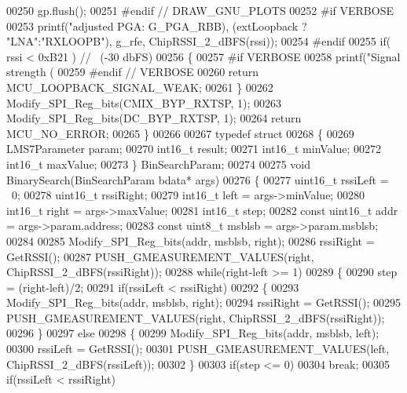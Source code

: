 \begin{DoxyCode}
{{{{{00250     gp.flush();
00251 \textcolor{preprocessor}{#endif // DRAW\_GNU\_PLOTS}
00252 \textcolor{preprocessor}{#if VERBOSE}
00253     printf(\textcolor{stringliteral}{"adjusted PGA: %
      G_PGA_RBB), (extLoopback ? \textcolor{stringliteral}{"LNA"}:\textcolor{stringliteral}{"RXLOOPB"}), g\_rfe, ChipRSSI\_2\_dBFS(rssi));
00254 \textcolor{preprocessor}{#endif}
00255     \textcolor{keywordflow}{if}( rssi < 0xB21 ) \textcolor{comment}{// ~(-30 dbFS)}
00256     \{
00257 \textcolor{preprocessor}{#if VERBOSE}
00258         printf(\textcolor{stringliteral}{"Signal strength (%
00259 \textcolor{preprocessor}{#endif // VERBOSE}
00260         \textcolor{keywordflow}{return} MCU_LOOPBACK_SIGNAL_WEAK;
00261     \}
00262     Modify_SPI_Reg_bits(CMIX_BYP_RXTSP, 1);
00263     Modify_SPI_Reg_bits(DC_BYP_RXTSP, 1);
00264     \textcolor{keywordflow}{return} MCU_NO_ERROR;
00265 \}
00266 
00267 \textcolor{keyword}{typedef} \textcolor{keyword}{struct}
00268 \{
00269     LMS7Parameter param;
00270     int16\_t result;
00271     int16\_t minValue;
00272     int16\_t maxValue;
00273 \} BinSearchParam;
00274 
00275 \textcolor{keywordtype}{void} BinarySearch(BinSearchParam bdata* args)
00276 \{
00277     uint16\_t rssiLeft = ~0;
00278     uint16\_t rssiRight;
00279     int16\_t left = args->minValue;
00280     int16\_t right = args->maxValue;
00281     int16\_t step;
00282     \textcolor{keyword}{const} uint16\_t addr = args->param.address;
00283     \textcolor{keyword}{const} uint8\_t msblsb = args->param.msblsb;
00284 
00285     Modify_SPI_Reg_bits(addr, msblsb, right);
00286     rssiRight = GetRSSI();
00287     PUSH_GMEASUREMENT_VALUES(right, ChipRSSI\_2\_dBFS(rssiRight));
00288     \textcolor{keywordflow}{while}(right-left >= 1)
00289     \{
00290         step = (right-left)/2;
00291         \textcolor{keywordflow}{if}(rssiLeft < rssiRight)
00292         \{
00293             Modify_SPI_Reg_bits(addr, msblsb, right);
00294             rssiRight = GetRSSI();
00295             PUSH_GMEASUREMENT_VALUES(right, ChipRSSI\_2\_dBFS(rssiRight));
00296         \}
00297         \textcolor{keywordflow}{else}
00298         \{
00299             Modify_SPI_Reg_bits(addr, msblsb, left);
00300             rssiLeft = GetRSSI();
00301             PUSH_GMEASUREMENT_VALUES(left, ChipRSSI\_2\_dBFS(rssiLeft));
00302         \}
00303         \textcolor{keywordflow}{if}(step <= 0)
00304             \textcolor{keywordflow}{break};
00305         \textcolor{keywordflow}{if}(rssiLeft < rssiRight)
}}}}}}}
\end{DoxyCode}
